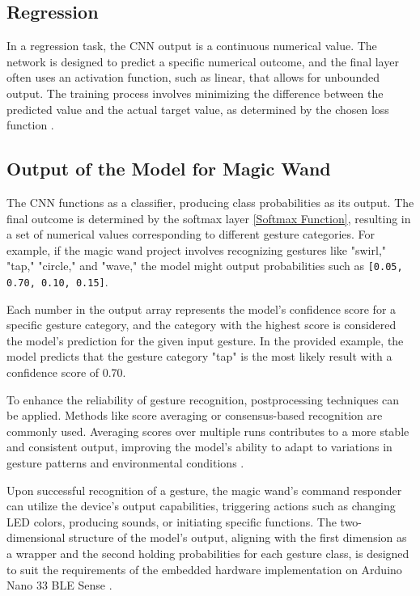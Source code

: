 \subsection{Regression}

In a regression task, the CNN output is a continuous numerical value. The network is designed to predict a specific numerical outcome, and the final layer often uses an activation function, such as linear, that allows for unbounded output. The training process involves minimizing the difference between the predicted value and the actual target value, as determined by the chosen loss function \cite{Xu:2022}.


\subsection{Output of the Model for Magic Wand}
\label{subsection:outputCNN}

The CNN functions as a classifier, producing class probabilities as its output. The final outcome is determined by the softmax layer \ref{Softmax Function}, resulting in a set of numerical values corresponding to different gesture categories. For example, if the magic wand project involves recognizing gestures like "swirl," "tap," "circle," and "wave," the model might output probabilities such as \texttt{[0.05, 0.70, 0.10, 0.15]}.

Each number in the output array represents the model's confidence score for a specific gesture category, and the category with the highest score is considered the model's prediction for the given input gesture. In the provided example, the model predicts that the gesture category "tap" is the most likely result with a confidence score of 0.70.

To enhance the reliability of gesture recognition, postprocessing techniques can be applied. Methods like score averaging or consensus-based recognition are commonly used. Averaging scores over multiple runs contributes to a more stable and consistent output, improving the model's ability to adapt to variations in gesture patterns and environmental conditions \cite{War:2020}.

Upon successful recognition of a gesture, the magic wand's command responder can utilize the device's output capabilities, triggering actions such as changing LED colors, producing sounds, or initiating specific functions. The two-dimensional structure of the model's output, aligning with the first dimension as a wrapper and the second holding probabilities for each gesture class, is designed to suit the requirements of the embedded hardware implementation on Arduino Nano 33 BLE Sense \cite{Set:2023}.

